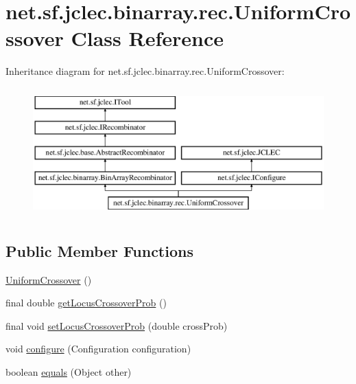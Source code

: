 \hypertarget{classnet_1_1sf_1_1jclec_1_1binarray_1_1rec_1_1_uniform_crossover}{\section{net.\-sf.\-jclec.\-binarray.\-rec.\-Uniform\-Crossover Class Reference}
\label{classnet_1_1sf_1_1jclec_1_1binarray_1_1rec_1_1_uniform_crossover}
}
Inheritance diagram for net.\-sf.\-jclec.\-binarray.\-rec.\-Uniform\-Crossover\-:\begin{figure}[H]
\begin{center}
\leavevmode
\includegraphics[height=5.000000cm]{classnet_1_1sf_1_1jclec_1_1binarray_1_1rec_1_1_uniform_crossover}
\end{center}
\end{figure}
\subsection*{Public Member Functions}
\begin{DoxyCompactItemize}
\item 
\hyperlink{classnet_1_1sf_1_1jclec_1_1binarray_1_1rec_1_1_uniform_crossover_a18a36f16881bf4a575c731c6657ed172}{Uniform\-Crossover} ()
\item 
final double \hyperlink{classnet_1_1sf_1_1jclec_1_1binarray_1_1rec_1_1_uniform_crossover_ad279b6b786cc2c6833454047999ad43b}{get\-Locus\-Crossover\-Prob} ()
\item 
final void \hyperlink{classnet_1_1sf_1_1jclec_1_1binarray_1_1rec_1_1_uniform_crossover_a789d072ad511765a2a832cbde2f87047}{set\-Locus\-Crossover\-Prob} (double cross\-Prob)
\item 
void \hyperlink{classnet_1_1sf_1_1jclec_1_1binarray_1_1rec_1_1_uniform_crossover_a654cf2adfa7210948d20c7e399bd3172}{configure} (Configuration configuration)
\item 
boolean \hyperlink{classnet_1_1sf_1_1jclec_1_1binarray_1_1rec_1_1_uniform_crossover_a11ddb24278a291f70725401e63208784}{equals} (Object other)
\end{DoxyCompactItemize}
